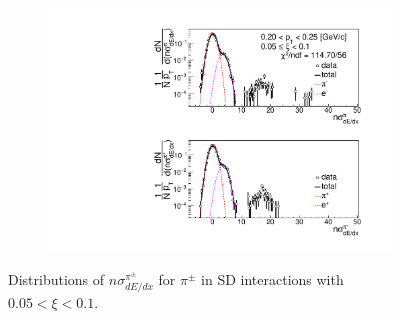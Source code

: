 \begin{figure}[h!]
\begin{subfigure}{.3\textwidth}
		\includegraphics[width=\linewidth, page=10]{chapters/chrgSTAR/img/dEdx/fit2019_secondStep_0_1.pdf}
	\end{subfigure}
	\caption[Distributions of $n\sigma^{\pi^\pm}_{dE/dx}$ for $\pi^\pm$ in SD interactions with $0.05 < \xi<0.1$]{Distributions of $n\sigma^{\pi^\pm}_{dE/dx}$ for $\pi^\pm$ in SD interactions with $0.05 < \xi<0.1$.}
	\label{fig:nsigmapifit_1}
\end{figure}

